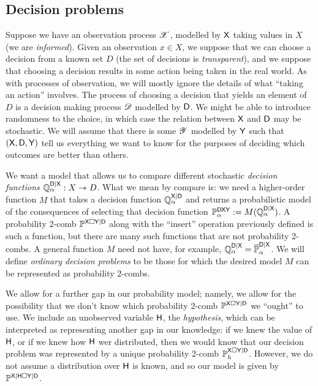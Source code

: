 \subsection{Decision problems}

Suppose we have an observation process $\mathscr{X}$, modelled by $\mathsf{X}$ taking values in $X$ (we are \emph{informed}). Given an observation $x\in X$, we suppose that we can choose a decision from a known set $D$ (the set of decisions is \emph{transparent}), and we suppose that choosing a decision results in some action being taken in the real world. As with processes of observation, we will mostly ignore the details of what ``taking an action'' involves. The process of choosing a decision that yields an element of $D$ is a decision making process $\mathscr{D}$ modelled by $\mathsf{D}$. We might be able to introduce randomness to the choice, in which case the relation between $\mathsf{X}$ and $\mathsf{D}$ may be stochastic.  We will assume that there is some $\mathscr{Y}$ modelled by $\mathsf{Y}$ such that $(\mathsf{X},\mathsf{D},\mathsf{Y})$ tell us everything we want to know for the purposes of deciding which outcomes are better than others.

We want a model that allows us to compare different stochastic \emph{decision functions} $\mathbb{Q}^{\mathsf{D}|\mathsf{X}}_\alpha:X\rightarrowtriangle D$. What we mean by compare is: we need a higher-order function $M$ that takes a decision function $\mathbb{Q}^{\mathsf{X}|\mathsf{D}}_\alpha$ and returns a probabilistic model of the consequences of selecting that decision function $\mathbb{P}_\alpha^{\mathsf{DXY}}:=M(\mathbb{Q}_\alpha^{\mathsf{D}|\mathsf{X}})$. A probability 2-comb $\mathbb{P}^{\mathsf{X}\square \mathsf{Y}|\mathsf{D}}$ along with the ``insert'' operation previously defined is such a function, but there are many such functions that are not probability 2-combs. A general function $M$ need not have, for example, $\mathbb{Q}_\alpha^{\mathsf{D}|\mathsf{X}}=\overline{\mathbb{P}}_\alpha^{\mathsf{D}|\mathsf{X}}$. We will define \emph{ordinary decision problems} to be those for which the desired model $M$ can be represented as probability 2-combs.

We allow for a further gap in our probability model; namely, we allow for the possibility that we don't know which probability 2-comb $\mathbb{P}^{\mathsf{X}\square \mathsf{Y}|\mathsf{D}}$ we ``ought'' to use. We include an unobserved variable $\mathsf{H}$, the \emph{hypothesis}, which can be interpreted as representing another gap in our knowledge: if we knew the value of $\mathsf{H}$, or if we knew how $\mathsf{H}$ wer distributed, then we would know that our decision problem was represented by a unique probability 2-comb $\mathbb{P}_h^{\mathsf{X}\square \mathsf{Y}|\mathsf{D}}$. However, we do not assume a distribution over $\mathsf{H}$ is known, and so our model is given by $\mathbb{P}^{\mathsf{X}|\mathsf{H}\square \mathsf{Y}|\mathsf{D}}$.

